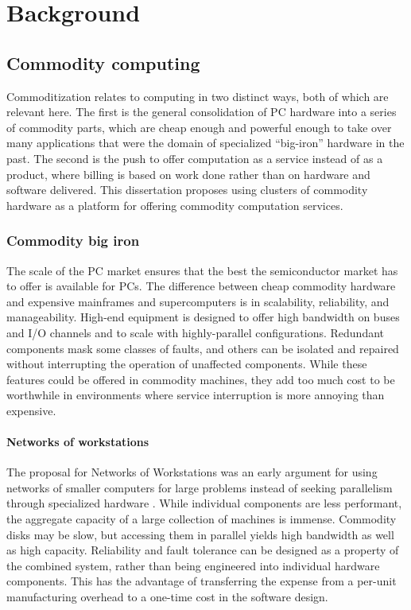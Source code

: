 \chapter{Background}\label{cha:background}

\section{Commodity computing}

Commoditization relates to computing in two distinct ways, both of which are relevant here. The first is the general consolidation of PC hardware into a series of commodity parts, which are cheap enough and powerful enough to take over many applications that were the domain of specialized ``big-iron'' hardware in the past. The second is the push to offer computation as a service instead of as a product, where billing is based on work done rather than on hardware and software delivered. This dissertation proposes using clusters of commodity hardware as a platform for offering commodity computation services.

\subsection{Commodity big iron}

The scale of the PC market ensures that the best the semiconductor market has to offer is available for PCs. The difference between cheap commodity hardware and expensive mainframes and supercomputers is in scalability, reliability, and manageability. High-end equipment is designed to offer high bandwidth on buses and I/O channels and to scale with highly-parallel configurations. Redundant components mask some classes of faults, and others can be isolated and repaired without interrupting the operation of unaffected components. While these features could be offered in commodity machines, they add too much cost to be worthwhile in environments where service interruption is more annoying than expensive.

\subsubsection{Networks of workstations}

The proposal for Networks of Workstations was an early argument for using networks of smaller computers for large problems instead of seeking parallelism through specialized hardware \cite{anderson95a}. While individual components are less performant, the aggregate capacity of a large collection of machines is immense. Commodity disks may be slow, but accessing them in parallel yields high bandwidth as well as high capacity. Reliability and fault tolerance can be designed as a property of the combined system, rather than being engineered into individual hardware components. This has the advantage of transferring the expense from a per-unit manufacturing overhead to a one-time cost in the software design.

